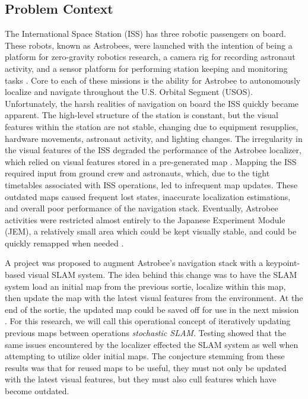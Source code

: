 \subsection{Problem Context}


The International Space Station (ISS) has three robotic passengers on board. These robots, known as Astrobees, were launched with the intention of being a platform for zero-gravity robotics research, a camera rig for recording astronaut activity, and a sensor platform for performing station keeping and monitoring tasks \cite{smithASTROBEENEWPLATFORM}. Core to each of these missions is the ability for Astrobee to autonomously localize and navigate throughout the U.S. Orbital Segment (USOS). Unfortunately, the harsh realities of navigation on board the ISS quickly became apparent. The high-level structure of the station is constant, but the visual features within the station are not stable, changing due to equipment resupplies, hardware movements, astronaut activity, and lighting changes. The irregularity in the visual features of the ISS degraded the performance of the Astrobee localizer, which relied on visual features stored in a pre-generated map \cite{soussanAstroLocEfficientRobust2022}. Mapping the ISS required input from ground crew and astronauts, which, due to the tight timetables associated with ISS operations, led to infrequent map updates. These outdated maps caused frequent lost states, inaccurate localization estimations, and overall poor performance of the navigation stack. Eventually, Astrobee activities were restricted almost entirely to the Japanese Experiment Module (JEM), a relatively small area which could be kept visually stable, and could be quickly remapped when needed \cite{carlinoLessonsLearnedAstrobee}.

A project was proposed to augment Astrobee's navigation stack with a keypoint-based visual SLAM system. The idea behind this change was to have the SLAM system load an initial map from the previous sortie, localize within this map, then update the map with the latest visual features from the environment. At the end of the sortie, the updated map could be saved off for use in the next mission \cite{zuralesCollaborativeSensingMapping2024}. For this research, we will call this operational concept of iteratively updating previous maps between operations \textit{stochastic SLAM}. Testing showed that the same issues encountered by the localizer effected the SLAM system as well when attempting to utilize older initial maps. The conjecture stemming from these results was that for reused maps to be useful, they must not only be updated with the latest visual features, but they must also cull features which have become outdated.

